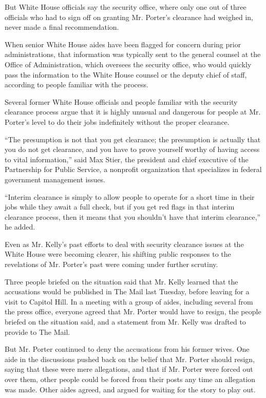 But White House officials say the security office, where only one out of
three officials who had to sign off on granting Mr. Porter's clearance
had weighed in, never made a final recommendation.

When senior White House aides have been flagged for concern during prior
administrations, that information was typically sent to the general
counsel at the Office of Administration, which oversees the security
office, who would quickly pass the information to the White House
counsel or the deputy chief of staff, according to people familiar with
the process.

Several former White House officials and people familiar with the
security clearance process argue that it is highly unusual and dangerous
for people at Mr. Porter's level to do their jobs indefinitely without
the proper clearance.

``The presumption is not that you get clearance; the presumption is
actually that you do not get clearance, and you have to prove yourself
worthy of having access to vital information,'' said Max Stier, the
president and chief executive of the Partnership for Public Service, a
nonprofit organization that specializes in federal government management
issues.

``Interim clearance is simply to allow people to operate for a short
time in their jobs while they await a full check, but if you get red
flags in that interim clearance process, then it means that you
shouldn't have that interim clearance,'' he added.

Even as Mr. Kelly's past efforts to deal with security clearance issues
at the White House were becoming clearer, his shifting public responses
to the revelations of Mr. Porter's past were coming under further
scrutiny.

Three people briefed on the situation said that Mr. Kelly learned that
the accusations would be published in The Mail last Tuesday, before
leaving for a visit to Capitol Hill. In a meeting with a group of aides,
including several from the press office, everyone agreed that Mr. Porter
would have to resign, the people briefed on the situation said, and a
statement from Mr. Kelly was drafted to provide to The Mail.

But Mr. Porter continued to deny the accusations from his former wives.
One aide in the discussions pushed back on the belief that Mr. Porter
should resign, saying that these were mere allegations, and that if Mr.
Porter were forced out over them, other people could be forced from
their posts any time an allegation was made. Other aides agreed, and
argued for waiting for the story to play out.

